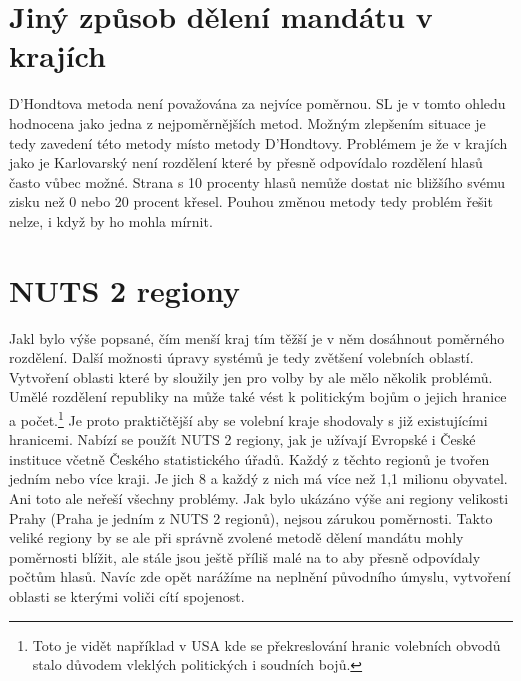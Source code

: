 \documentclass[12pt]{report}
\begin{document}
\section{Jiný způsob dělení mandátu v krajích} D'Hondtova metoda není považována za nejvíce poměrnou.
SL je v tomto ohledu hodnocena jako jedna z nejpoměrnějších metod.\autocite{BEN} Možným zlepšením situace je tedy zavedení této metody místo metody D'Hondtovy.
Problémem je že v krajích jako je Karlovarský není rozdělení které by přesně odpovídalo rozdělení hlasů často vůbec možné.
Strana s 10 procenty hlasů nemůže dostat nic bližšího svému zisku než 0 nebo 20 procent křesel.
Pouhou změnou metody tedy problém řešit nelze, i když by ho mohla mírnit.
\section{NUTS 2 regiony} Jakl bylo výše popsané, čím menší kraj tím těžší je v něm dosáhnout poměrného rozdělení.
Další možnosti úpravy systémů je tedy zvětšení volebních oblastí.
Vytvoření oblasti které by sloužily jen pro volby by ale mělo několik problémů.
Umělé rozdělení republiky na  může také vést k politickým bojům o jejich hranice a počet.\footnote{Toto je vidět například v USA kde se překreslování hranic volebních obvodů stalo důvodem vleklých politických i soudních bojů.} Je proto praktičtější aby se volební kraje shodovaly s již existujícími hranicemi.
Nabízí se použít NUTS 2 regiony, jak je užívají Evropské i České instituce včetně Českého statistického úřadů.
Každý z těchto regionů je tvořen jedním nebo více kraji.
Je jich 8 a každý z nich má více než 1,1 milionu obyvatel.
Ani toto ale neřeší všechny problémy.
Jak bylo ukázáno výše ani regiony velikosti Prahy (Praha je jedním z NUTS 2 regionů), nejsou zárukou poměrnosti.
Takto veliké regiony by se ale při správně zvolené metodě dělení mandátu mohly poměrnosti blížit, ale stále jsou ještě příliš malé na to aby přesně odpovídaly počtům hlasů.
Navíc zde opět narážíme na neplnění původního úmyslu, vytvoření oblasti se kterými voliči cítí spojenost.
\end{document}
